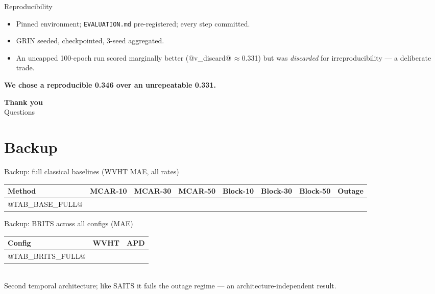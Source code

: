 \documentclass[aspectratio=169]{beamer}
\newcommand{\take}[1]{\vspace{0.6ex}\begin{center}\textbf{\color{colgraph}#1}\end{center}}
\begin{document}
\begin{frame}{Reproducibility}
  \begin{itemize}\small
    \item Pinned environment; \texttt{EVALUATION.md} pre-registered; every step committed.
    \item GRIN seeded, checkpointed, 3-seed aggregated.
    \item An uncapped 100-epoch run scored marginally better (@v_discard@\,$\approx$0.331) but was \emph{discarded} for irreproducibility --- a deliberate trade.
  \end{itemize}
  \take{We chose a reproducible 0.346 over an unrepeatable 0.331.}
\end{frame}

\begin{frame}[plain]
  \vfill\begin{center}
  {\color{colgraph}\Large\bfseries Thank you}\\[1ex]
  {\large Questions}
  \end{center}\vfill
\end{frame}

\appendix
\section{Backup}

\begin{frame}{Backup: full classical baselines (WVHT MAE, all rates)}
  \begin{center}\scriptsize
  \begin{tabular}{l ccc ccc c}
    \toprule
    Method & MCAR-10 & MCAR-30 & MCAR-50 & Block-10 & Block-30 & Block-50 & Outage\\
    \midrule
@TAB_BASE_FULL@
    \bottomrule
  \end{tabular}
  \end{center}
\end{frame}

\begin{frame}{Backup: BRITS across all configs (MAE)}
  \begin{center}\footnotesize
  \begin{tabular}{l cc}
    \toprule
    Config & WVHT & APD\\
    \midrule
@TAB_BRITS_FULL@
    \bottomrule
  \end{tabular}\\[0.5ex]
  {\footnotesize Second temporal architecture; like SAITS it fails the outage regime --- an architecture-independent result.}
  \end{center}
\end{frame}
\end{document}

